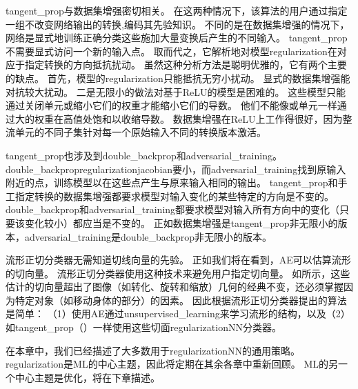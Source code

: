 \gls{tangent_prop}与数据集增强密切相关。
在这两种情况下，该算法的用户通过指定一组不改变网络输出的转换,编码其先验知识。
不同的是在数据集增强的情况下，网络是显式地训练正确分类这些施加大量变换后产生的不同输入。
\gls{tangent_prop}不需要显式访问一个新的输入点。
取而代之，它解析地对模型\gls{regularization}在对应于指定转换的方向抵抗扰动。
虽然这种分析方法是聪明优雅的，它有两个主要的缺点。
首先，模型的\gls{regularization}只能抵抗无穷小扰动。
显式的数据集增强能对抗较大扰动。
二是无限小的做法对基于\gls{ReLU}的模型是困难的。
这些模型只能通过关闭单元或缩小它们的权重才能缩小它们的导数。
他们不能像或单元一样通过大的权重在高值处饱和以收缩导数。
数据集增强在\gls{ReLU}上工作得很好，因为整流单元的不同子集针对每一个原始输入不同的转换版本激活。


\gls{tangent_prop}也涉及到\gls{double_backprop}\citep{DruckerLeCun92}和\gls{adversarial_training}\citep{Szegedy-et-al-arxiv2014,Goodfellow-2015-adversarial}。
\gls{double_backprop}\gls{regularization}\gls{jacobian}要小，而\gls{adversarial_training}找到原输入附近的点，训练模型以在这些点产生与原来输入相同的输出。
\gls{tangent_prop}和手工指定转换的数据集增强都要求模型对输入变化的某些特定的方向是不变的。
\gls{double_backprop}和\gls{adversarial_training}都要求模型对输入所有方向中的变化（只要该变化较小）都应当是不变的。
正如数据集增强是\gls{tangent_prop}非无限小的版本，\gls{adversarial_training}是\gls{double_backprop}非无限小的版本。

流形正切分类器\citep{Dauphin-et-al-NIPS2011}无需知道切线向量的先验。
正如我们将在看到，\gls{AE}可以估算流形的切向量。
流形正切分类器使用这种技术来避免用户指定切向量。
如所示，这些估计的切向量超出了图像（如转化、旋转和缩放）几何的经典不变，还必须掌握因为特定对象（如移动身体的部分）的因素。
因此根据流形正切分类器提出的算法是简单：
（1）使用\gls{AE}通过\gls{unsupervised_learning}来学习流形的结构，以及（2）如\gls{tangent_prop}（）一样使用这些切面\gls{regularization}\gls{NN}分类器。

在本章中，我们已经描述了大多数用于\gls{regularization}\gls{NN}的通用策略。
\gls{regularization}是\gls{ML}的中心主题，因此将定期在其余各章中重新回顾。
\gls{ML}的另一个中心主题是优化，将在下章描述。

